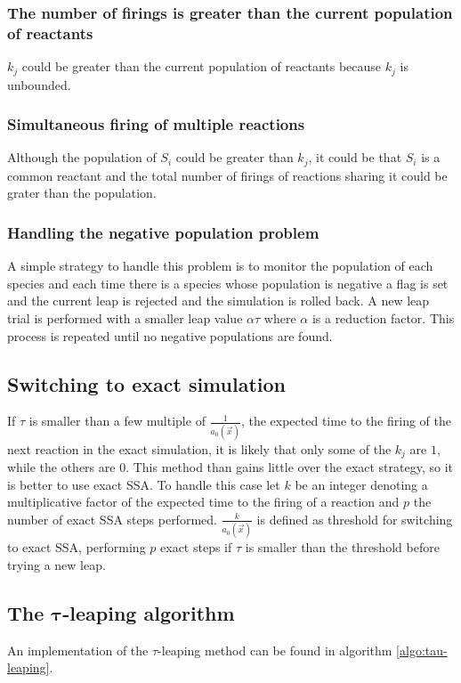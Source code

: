     \subsubsection{The number of firings is greater than the current population of reactants}
    $k_j$ could be greater than the current population of reactants because $k_j$ is unbounded.

    \subsubsection{Simultaneous firing of multiple reactions}
    Although the population of $S_i$ could be greater than $k_j$, it could be that $S_i$ is a common reactant and the total number of firings of reactions sharing it could be grater than the population.

    \subsubsection{Handling the negative population problem}
    A simple strategy to handle this problem is to monitor the population of each species and each time there is a species whose population is negative a flag is set and the current leap is rejected and the simulation is rolled back.
    A new leap trial is performed with a smaller leap value $\alpha\tau$ where $\alpha$ is a reduction factor.
    This process is repeated until no negative populations are found.

  \subsection{Switching to exact simulation}
  If $\tau$ is smaller than a few multiple of $\frac{1}{a_0(\vec{x})}$, the expected time to the firing of the next reaction in the exact simulation, it is likely that only some of the $k_j$ are $1$, while the others are $0$.
  This method than gains little over the exact strategy, so it is better to use exact SSA.
  To handle this case let $k$ be an integer denoting a multiplicative factor of the expected time to the firing of a reaction and $p$ the number of exact SSA steps performed.
  $\frac{k}{a_0(\vec{x})}$ is defined as threshold for switching to exact SSA, performing $p$ exact steps if $\tau$ is smaller than the threshold before trying a new leap.

  \subsection{The $\mathbf{\tau}$-leaping algorithm}
  An implementation of the $\tau$-leaping method can be found in algorithm \ref{algo:tau-leaping}.

